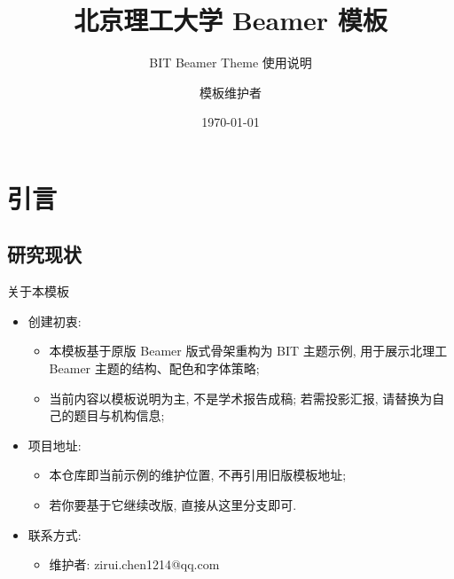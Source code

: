 \documentclass[hyperref, UTF8, CJK, aspectratio=169]{beamer}
\title[北京理工大学 Beamer 模板 | 使用说明]{北京理工大学 Beamer 模板}
\subtitle{BIT Beamer Theme 使用说明} %
\author[BIT Beamer Theme]{模板维护者\inst{1}}
\institute{%
	\inst{1} 北京理工大学
	\\\mailbit{your.name@bit.edu.cn}
}
\date{\today}
\begin{document}

\section{引言}
\subsection{研究现状}
\begin{frame}{关于本模板}%
	\begin{itemize}
		\item 创建初衷:
		\begin{itemize}
			\item 本模板基于原版 Beamer 版式骨架重构为 BIT 主题示例, 用于展示北理工 Beamer 主题的结构、配色和字体策略;
			\item 当前内容以模板说明为主, 不是学术报告成稿; 若需投影汇报, 请替换为自己的题目与机构信息;
		\end{itemize}
		\item 项目地址:
		\begin{itemize}
			\item 本仓库即当前示例的维护位置, 不再引用旧版模板地址;
			\item 若你要基于它继续改版, 直接从这里分支即可.
		\end{itemize}
			\item 联系方式:
			\begin{itemize}
				\item 维护者: zirui.chen1214@qq.com
			\end{itemize}
		\end{itemize}
	\end{frame}
\end{document}
